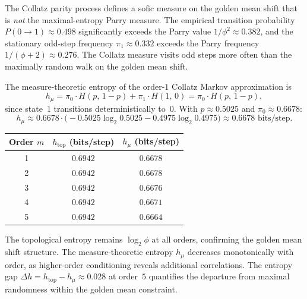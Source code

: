 \documentclass[11pt,a4paper]{article}
\theoremstyle{plain}
\theoremstyle{definition}
\begin{document}
\begin{keyinsight}
    The Collatz parity process defines a sofic measure on the golden
    mean shift that is \emph{not} the maximal-entropy Parry measure.
    The empirical transition probability
    $P(0 \to 1) \approx 0.498$ significantly exceeds the Parry
    value $1/\phi^2 \approx 0.382$, and the stationary odd-step
    frequency $\pi_1 \approx 0.332$ exceeds the Parry frequency
    $1/(\phi + 2) \approx 0.276$.  The Collatz measure visits odd
    steps more often than the maximally random walk on the golden
    mean shift.
\end{keyinsight}

The measure-theoretic entropy of the order-$1$ Collatz Markov
approximation is
\begin{equation}\label{eq:hmeas}
    h_\mu = \pi_0 \cdot H(p,\, 1{-}p)
          + \pi_1 \cdot H(1,\, 0)
          = \pi_0 \cdot H(p,\, 1{-}p),
\end{equation}
since state~$1$ transitions deterministically to~$0$.  With
$p \approx 0.5025$ and $\pi_0 \approx 0.6678$:
\begin{equation}
    h_\mu \approx 0.6678 \cdot
    \bigl(\!-0.5025 \log_2 0.5025
           - 0.4975 \log_2 0.4975\bigr)
    \approx 0.6678 \text{ bits/step}.
\end{equation}

\begin{empirical}
\label{obs:entropy-convergence}
    \begin{center}
    \renewcommand{\arraystretch}{1.15}
    \begin{tabular}{ccc}
        \toprule
        Order $m$ & $h_{\mathrm{top}}$ (bits/step)
                  & $h_\mu$ (bits/step) \\
        \midrule
        1 & $0.6942$ & $0.6678$ \\
        2 & $0.6942$ & $0.6678$ \\
        3 & $0.6942$ & $0.6676$ \\
        4 & $0.6942$ & $0.6671$ \\
        5 & $0.6942$ & $0.6664$ \\
        \bottomrule
    \end{tabular}
    \end{center}
    The topological entropy remains $\log_2 \phi$ at all orders,
    confirming the golden mean shift structure.  The
    measure-theoretic entropy $h_\mu$ decreases monotonically with
    order, as higher-order conditioning reveals additional
    correlations.  The entropy gap
    $\Delta h = h_{\mathrm{top}} - h_\mu \approx 0.028$ at
    order~$5$ quantifies the departure from maximal randomness
    within the golden mean constraint.
\end{empirical}
\end{document}
